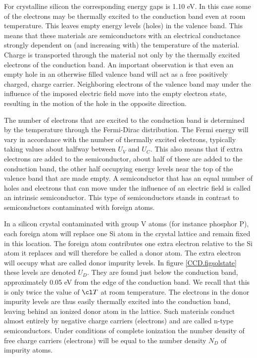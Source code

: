 For crystalline silicon the corresponding energy gaps is 1.10 eV. In
this case some of the electrons may be thermally excited to the
conduction band even at room temperature. This leaves empty energy
levels (holes) in the valence band. This means that these materials
are semiconductors with an electrical conductance strongly dependent
on (and increasing with) the temperature of the material. Charge is
transported through the material not only by the thermally excited
electrons of the conduction band. An important observation is that
even an empty hole in an otherwise filled valence band will act as a
free positively charged, charge carrier. Neighboring electrons of the
valence band may under the influence of the imposed electric field
move into the empty electron state, resulting in the motion of the
hole in the opposite direction.

The number of electrons that are excited to the conduction band is
determined by the temperature through the Fermi-Dirac
distribution. The Fermi energy will vary in accordance with the number
of thermally excited electrons, typically taking values about halfway
between $U_V$ and $U_C$. This also means that if extra electrons are
added to the semiconductor, about half of these are added to the
conduction band, the other half occupying energy levels near the top
of the valence band that are made empty. A semiconductor that has an
equal number of holes and electrons that can move under the influence
of an electric field is called an intrinsic semiconductor. This type
of semiconductors stands in contrast to semiconductors contaminated
with foreign atoms.

In a silicon crystal contaminated with group V atoms (for instance
phosphor P), each foreign atom will replace one Si atom in the crystal
lattice and remain fixed in this location. The foreign atom
contributes one extra electron relative to the Si atom it replaces and
will therefore be called a donor atom. The extra electron will occupy
what are called donor impurity levels. In figure \ref{CCD.figsolstate}
these levels are denoted $U_D$. They are found just below the
conduction band, approximately 0.05 eV from the edge of the conduction
band. We recall that this is only twice the value of $\cl T$ at room
temperature. The electrons in the donor impurity levels are thus
easily thermally excited into the conduction band, leaving behind an
ionized donor atom in the lattice. Such materials conduct almost
entirely by negative charge carriers (electrons) and are called n-type
semiconductors. Under conditions of complete ionization the number
density of free charge carriers (electrons) will be equal to the
number density $N_D$ of impurity atoms.

